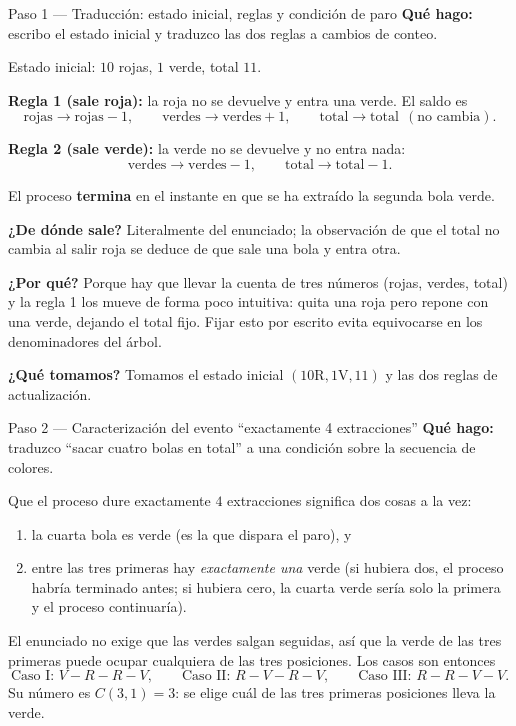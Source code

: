 \documentclass[11pt]{article}
\begin{document}
\begin{sol}

\begin{paso}{Paso 1 --- Traducci\'on: estado inicial, reglas y condici\'on de paro}
\textbf{Qu\'e hago:} escribo el estado inicial y traduzco las dos reglas a cambios de conteo.

Estado inicial: $10$ rojas, $1$ verde, total $11$.

\textbf{Regla 1 (sale roja):} la roja no se devuelve y entra una verde. El saldo es
\[
\text{rojas} \to \text{rojas}-1,
\qquad
\text{verdes}\to\text{verdes}+1,
\qquad
\text{total}\to\text{total} \ \ (\text{no cambia}).
\]

\textbf{Regla 2 (sale verde):} la verde no se devuelve y no entra nada:
\[
\text{verdes}\to\text{verdes}-1,
\qquad
\text{total}\to\text{total}-1 .
\]

El proceso \textbf{termina} en el instante en que se ha extra\'ido la segunda bola verde.

\textbf{¿De d\'onde sale?} Literalmente del enunciado; la observaci\'on de que el total no cambia al salir roja se deduce de que sale una bola y entra otra.

\textbf{¿Por qu\'e?} Porque hay que llevar la cuenta de tres n\'umeros (rojas, verdes, total) y la regla 1 los mueve de forma poco intuitiva: quita una roja pero repone con una verde, dejando el total fijo. Fijar esto por escrito evita equivocarse en los denominadores del \'arbol.

\textbf{¿Qu\'e tomamos?} Tomamos el estado inicial $(10\text{R},1\text{V},11)$ y las dos reglas de actualizaci\'on.
\end{paso}

\begin{paso}{Paso 2 --- Caracterizaci\'on del evento ``exactamente 4 extracciones''}
\textbf{Qu\'e hago:} traduzco ``sacar cuatro bolas en total'' a una condici\'on sobre la secuencia de colores.

Que el proceso dure exactamente $4$ extracciones significa dos cosas a la vez:
\begin{enumerate}[leftmargin=*]
  \item la cuarta bola es verde (es la que dispara el paro), y
  \item entre las tres primeras hay \emph{exactamente una} verde (si hubiera dos, el proceso habr\'ia terminado antes; si hubiera cero, la cuarta verde ser\'ia solo la primera y el proceso continuar\'ia).
\end{enumerate}
El enunciado no exige que las verdes salgan seguidas, as\'i que la verde de las tres primeras puede ocupar cualquiera de las tres posiciones. Los casos son entonces
\[
\text{Caso I: } V\!-\!R\!-\!R\!-\!V,
\qquad
\text{Caso II: } R\!-\!V\!-\!R\!-\!V,
\qquad
\text{Caso III: } R\!-\!R\!-\!V\!-\!V .
\]
Su n\'umero es $C(3,1)=3$: se elige cu\'al de las tres primeras posiciones lleva la verde.


\end{paso}
\end{sol}
\end{document}
